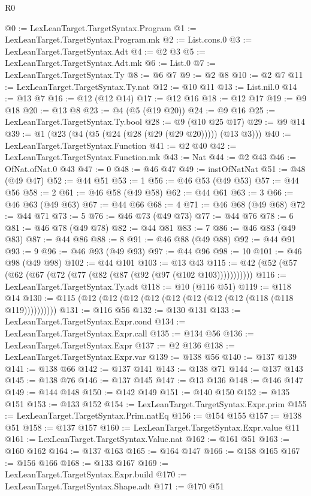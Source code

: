 \begin{lexlean}{R0}
\begin{coremodule}
@0 := LexLeanTarget.TargetSyntax.Program
@1 := LexLeanTarget.TargetSyntax.Program.mk
@2 := List.cons.{0}
@3 := LexLeanTarget.TargetSyntax.Adt
@4 := @2 @3
@5 := LexLeanTarget.TargetSyntax.Adt.mk
@6 := List.{0}
@7 := LexLeanTarget.TargetSyntax.Ty
@8 := @6 @7
@9 := @2 @8
@10 := @2 @7
@11 := LexLeanTarget.TargetSyntax.Ty.nat
@12 := @10 @11
@13 := List.nil.{0}
@14 := @13 @7
@16 := @12 (@12 @14)
@17 := @12 @16
@18 := @12 @17
@19 := @9 @18
@20 := @13 @8
@23 := @4 (@5 (@19 @20))
@24 := @9 @16
@25 := LexLeanTarget.TargetSyntax.Ty.bool
@28 := @9 (@10 @25 @17)
@29 := @9 @14
@39 := @1 (@23 (@4 (@5 (@24 (@28 (@29 (@29 @20))))) (@13 @3)))
@40 := LexLeanTarget.TargetSyntax.Function
@41 := @2 @40
@42 := LexLeanTarget.TargetSyntax.Function.mk
@43 := Nat
@44 := @2 @43
@46 := OfNat.ofNat.{0} @43
@47 := 0
@48 := @46 @47
@49 := instOfNatNat
@51 := @48 (@49 @47)
@52 := @44 @51
@53 := 1
@56 := @46 @53 (@49 @53)
@57 := @44 @56
@58 := 2
@61 := @46 @58 (@49 @58)
@62 := @44 @61
@63 := 3
@66 := @46 @63 (@49 @63)
@67 := @44 @66
@68 := 4
@71 := @46 @68 (@49 @68)
@72 := @44 @71
@73 := 5
@76 := @46 @73 (@49 @73)
@77 := @44 @76
@78 := 6
@81 := @46 @78 (@49 @78)
@82 := @44 @81
@83 := 7
@86 := @46 @83 (@49 @83)
@87 := @44 @86
@88 := 8
@91 := @46 @88 (@49 @88)
@92 := @44 @91
@93 := 9
@96 := @46 @93 (@49 @93)
@97 := @44 @96
@98 := 10
@101 := @46 @98 (@49 @98)
@102 := @44 @101
@103 := @13 @43
@115 := @42 (@52 (@57 (@62 (@67 (@72 (@77 (@82 (@87 (@92 (@97 (@102 @103)))))))))))
@116 := LexLeanTarget.TargetSyntax.Ty.adt
@118 := @10 (@116 @51)
@119 := @118 @14
@130 := @115 (@12 (@12 (@12 (@12 (@12 (@12 (@12 (@12 (@118 (@118 @119))))))))))
@131 := @116 @56
@132 := @130 @131
@133 := LexLeanTarget.TargetSyntax.Expr.cond
@134 := LexLeanTarget.TargetSyntax.Expr.call
@135 := @134 @56
@136 := LexLeanTarget.TargetSyntax.Expr
@137 := @2 @136
@138 := LexLeanTarget.TargetSyntax.Expr.var
@139 := @138 @56
@140 := @137 @139
@141 := @138 @66
@142 := @137 @141
@143 := @138 @71
@144 := @137 @143
@145 := @138 @76
@146 := @137 @145
@147 := @13 @136
@148 := @146 @147
@149 := @144 @148
@150 := @142 @149
@151 := @140 @150
@152 := @135 @151
@153 := @133 @152
@154 := LexLeanTarget.TargetSyntax.Expr.prim
@155 := LexLeanTarget.TargetSyntax.Prim.natEq
@156 := @154 @155
@157 := @138 @51
@158 := @137 @157
@160 := LexLeanTarget.TargetSyntax.Expr.value @11
@161 := LexLeanTarget.TargetSyntax.Value.nat
@162 := @161 @51
@163 := @160 @162
@164 := @137 @163
@165 := @164 @147
@166 := @158 @165
@167 := @156 @166
@168 := @133 @167
@169 := LexLeanTarget.TargetSyntax.Expr.build
@170 := LexLeanTarget.TargetSyntax.Shape.adt
@171 := @170 @51

\end{coremodule}
\end{lexlean}
